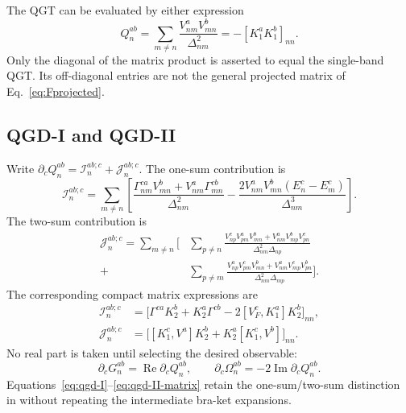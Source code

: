 \documentclass[prx,amsmath,amssymb,superscriptaddress,longbibliography]{revtex4-2}
\newcommand{\Rea}{\operatorname{Re}}
\newcommand{\Ima}{\operatorname{Im}}
\newcommand{\code}[1]{\texttt{\detokenize{#1}}}
\begin{document}
The QGT can be evaluated by either expression
\begin{equation}
 Q_n^{ab}=\sum_{m\ne n}\frac{V_{nm}^aV_{mn}^b}{\Delta_{nm}^2}
          =-[K_1^aK_1^b]_{nn}.
 \label{eq:qgt-matrix}
\end{equation}
Only the diagonal of the matrix product is asserted to equal the
single-band QGT. Its off-diagonal entries are not the general projected
matrix of Eq.~\eqref{eq:Fprojected}.

\subsection{QGD-I and QGD-II}
Write $\partial_cQ_n^{ab}=\mathcal I_n^{ab;c}+\mathcal J_n^{ab;c}$.
The one-sum contribution is
\begin{equation}
 \mathcal I_n^{ab;c}=\sum_{m\ne n}\left[
 \frac{\Gamma_{nm}^{ca}V_{mn}^b+V_{nm}^a\Gamma_{mn}^{cb}}{\Delta_{nm}^2}
 -\frac{2V_{nm}^aV_{mn}^b(E_n^c-E_m^c)}{\Delta_{nm}^3}\right].
 \label{eq:qgd-I}
\end{equation}
The two-sum contribution is
\begin{align}
 \mathcal J_n^{ab;c}=\sum_{m\ne n}\bigg[
 &\sum_{p\ne n}\frac{V_{np}^cV_{pm}^aV_{mn}^b
                        +V_{nm}^aV_{mp}^bV_{pn}^c}
                       {\Delta_{nm}^2\Delta_{np}}
 \nonumber\\
 +&\sum_{p\ne m}\frac{V_{np}^aV_{pm}^cV_{mn}^b
                        +V_{nm}^aV_{mp}^cV_{pn}^b}
                       {\Delta_{nm}^2\Delta_{mp}}\bigg].
 \label{eq:qgd-II}
\end{align}
The corresponding compact matrix expressions are
\begin{align}
 \mathcal I_n^{ab;c}
 &=\big[\Gamma^{ca}K_2^b+K_2^a\Gamma^{cb}
        -2[V_F^c,K_1^a]K_2^b\big]_{nn},\label{eq:qgd-I-matrix}\\
 \mathcal J_n^{ab;c}
 &=\big[[K_1^c,V^a]K_2^b+K_2^a[K_1^c,V^b]\big]_{nn}.
 \label{eq:qgd-II-matrix}
\end{align}
No real part is taken until selecting the desired observable:
\begin{equation}
 \partial_cG_n^{ab}=\Rea\partial_cQ_n^{ab},\qquad
 \partial_c\Omega_n^{ab}=-2\Ima\partial_cQ_n^{ab}.
 \label{eq:qgd-observables}
\end{equation}
Equations~\eqref{eq:qgd-I}--\eqref{eq:qgd-II-matrix} retain the
one-sum/two-sum distinction in \code{QGD.tex} without repeating the intermediate bra-ket expansions.
\end{document}
